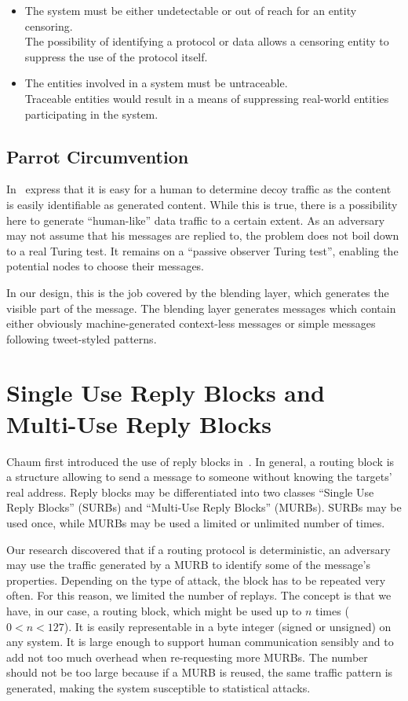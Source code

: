 \begin{itemize}
	\item The system must be either undetectable or out of reach for an entity censoring.\\
	The possibility of identifying a protocol or data allows a censoring entity to suppress the use of the protocol itself. 
	\item The entities involved in a system must be untraceable.\\
	Traceable entities would result in a means of suppressing real-world entities participating in the system.
\end{itemize}

\subsection{Parrot Circumvention}
In~\cite{oakland2013-parrot} \citeauthor{oakland2013-parrot} express that it is easy for a human to determine decoy traffic as the content is easily identifiable as generated content. While this is true, there is a possibility here to generate ``human-like'' data traffic to a certain extent. As an adversary may not assume that his messages are replied to, the problem does not boil down to a real Turing test. It remains on a ``passive observer Turing test'', enabling the potential nodes to choose their messages. 

In our design, this is the job covered by the blending layer, which generates the visible part of the message. The blending layer generates messages which contain either obviously machine-generated context-less messages or simple messages following tweet-styled patterns. 

\section{Single Use Reply Blocks and Multi-Use Reply Blocks}
Chaum first introduced the use of reply blocks in~\cite{CHAUM1}. In general, a routing block is a structure allowing to send a message to someone without knowing the targets' real address. Reply blocks may be differentiated into two classes ``Single Use Reply Blocks'' (SURBs)  and ``Multi-Use Reply Blocks'' (MURBs). SURBs may be used once, while MURBs may be used a limited or unlimited number of times. 

Our research discovered that if a routing protocol is deterministic, an adversary may use the traffic generated by a MURB to identify some of the message's properties. Depending on the type of attack, the block has to be repeated very often. For this reason, we limited the number of replays. The concept is that we have, in our case, a routing block, which might be used up to $n$ times ($0<n<127$). It is easily representable in a byte integer (signed or unsigned) on any system. It is large enough to support human communication sensibly and to add not too much overhead when re-requesting more MURBs. The number should not be too large because if a MURB is reused, the same traffic pattern is generated, making the system susceptible to statistical attacks.

